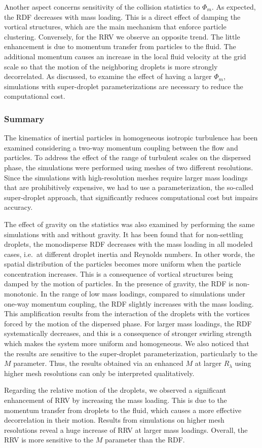 \documentclass[../thesis.tex]{subfiles}
\begin{document}
Another aspect concerns sensitivity of the collision statistics to $\Phi_m$. As expected, the RDF decreases with mass loading. This is a direct effect of damping the vortical structures, which are the main mechanism that enforce particle clustering. Conversely, for the RRV we observe an opposite trend. The little enhancement is due to momentum transfer from particles to the fluid. The additional momentum causes an increase in the local fluid velocity at the grid scale so that the motion of the neighboring droplets is more strongly decorrelated. As discussed, to examine the effect of having a larger $\Phi_m$, simulations with super-droplet parameterizations are necessary to reduce the computational cost.

\subsubsection{Summary}
The kinematics of inertial particles in homogeneous isotropic turbulence has been examined considering a two-way momentum coupling between the flow and particles. To address the effect of the range of turbulent scales on the dispersed phase, the simulations were performed using meshes of two different resolutions. Since the simulations with high-resolution meshes require larger mass loadings that are prohibitively expensive, we had to use a parameterization, the so-called super-droplet approach, that significantly reduces computational cost but impairs accuracy.

The effect of gravity on the statistics was also examined by performing the same simulations with and without gravity. It has been found that for non-settling droplets, the monodisperse RDF decreases with the mass loading in all modeled cases, i.e.\ at different droplet inertia and Reynolds numbers. In other words, the spatial distribution of the particles becomes more uniform when the particle concentration increases. This is a consequence of vortical structures being damped by the motion of particles. In the presence of gravity, the RDF is non-monotonic. In the range of low mass loadings, compared to simulations under one-way momentum coupling, the RDF slightly increases with the mass loading. This amplification results from the interaction of the droplets with the vortices forced by the motion of the dispersed phase. For larger mass loadings, the RDF systematically decreases, and this is a consequence of stronger swirling strength which makes the system more uniform and homogeneous. We also noticed that the results are sensitive to the super-droplet parameterization, particularly to the $M$ parameter. Thus, the results obtained via an enhanced $M$ at larger $R_{\lambda}$ using higher mesh resolutions can only be interpreted qualitatively.

Regarding the relative motion of the droplets, we observed a significant enhancement of RRV by increasing the mass loading. This is due to the momentum transfer from droplets to the fluid, which causes a more effective decorrelation in their motion. Results from simulations on higher mesh resolutions reveal a huge increase of RRV at larger mass loadings. Overall, the RRV is more sensitive to the $M$ parameter than the RDF.

%
%
\newpage
\end{document}
